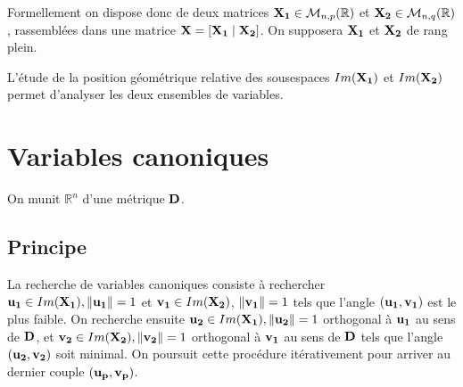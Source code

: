 \documentclass[letterpaper,10pt,french]{sphinxmanual}
\begin{document}
\sphinxAtStartPar
Formellement on dispose donc de deux matrices \({\bf {\bf X_1}}\in\mathcal{M}_{n,p}(\mathbb{R})\) et \({\bf {\bf X_2}}\in\mathcal{M}_{n,q}(\mathbb{R})\), rassemblées dans une matrice \({\bf X}=\left[{\bf {\bf X_1}}\mid {\bf {\bf X_2}} \right ]\). On supposera \({\bf {\bf X_1}}\) et \({\bf {\bf X_2}}\) de rang plein.

\sphinxAtStartPar
L’étude de la position géométrique relative des sous\sphinxhyphen{}espaces \(Im({\bf {\bf X_1}})\) et \(Im({\bf {\bf X_2}})\) permet d’analyser les deux ensembles de variables.


\section{Variables canoniques}
\label{\detokenize{canonique:variables-canoniques}}
\sphinxAtStartPar
On munit \(\mathbb{R}^n\) d’une métrique \({\bf D}\).


\subsection{Principe}
\label{\detokenize{canonique:principe}}
\sphinxAtStartPar
La recherche de variables canoniques consiste à rechercher \({\bf {\bf u_1}}\in Im({\bf {\bf X_1}}), \Vert {\bf {\bf u_1}}\Vert=1\) et  \({\bf v_1}\in Im({\bf {\bf X_2}})\), \(\Vert {\bf v_1}\Vert=1\) tels que l’angle \(({\bf {\bf u_1}},{\bf v_1})\) est le plus faible. On recherche ensuite \({\bf {\bf u_2}}\in Im({\bf {\bf X_1}}), \Vert {\bf {\bf u_2}}\Vert=1\) orthogonal à \({\bf {\bf u_1}}\) au sens de \({\bf D}\), et \({\bf v_2}\in Im({\bf {\bf X_2}}), \Vert {\bf v_2}\Vert=1\) orthogonal à \({\bf v_1}\) au sens de \({\bf D}\) tels que l’angle \(({\bf {\bf u_2}},{\bf v_2})\) soit minimal. On poursuit cette procédure itérativement pour arriver au dernier couple \(({\bf u_p},{\bf v_p})\).
\end{document}
